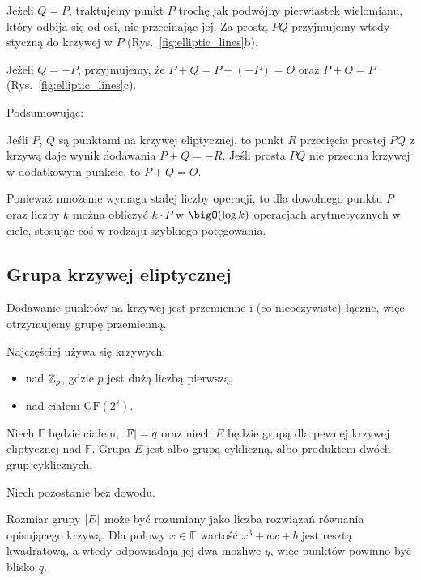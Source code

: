 Jeżeli \( Q = P \), traktujemy punkt \( P \) trochę jak podwójny pierwiastek wielomianu, który odbija się od osi, nie przecinając jej.
Za prostą \( PQ \) przyjmujemy wtedy styczną do krzywej w \( P \) (Rys.~\ref{fig:elliptic_lines}b).

Jeżeli \( Q = -P \), przyjmujemy, że \( P + Q = P + (-P) = O \) oraz \(P + O = P \) (Rys.~\ref{fig:elliptic_lines}c).

Podsumowując:
\begin{definition}[Dodawanie]
    Jeśli \( P \), \( Q \) są punktami na krzywej eliptycznej, to punkt \( R \) przecięcia prostej \( PQ \) z krzywą daje wynik dodawania \( P + Q = -R \).
    Jeśli prosta \( PQ \) nie przecina krzywej w dodatkowym punkcie, to \( P + Q = O \).
\end{definition}

Ponieważ mnożenie wymaga stałej liczby operacji, to dla dowolnego punktu \( P \) oraz liczby \( k \) można obliczyć \( k \cdot P \) w \( \bigO(\log k) \) operacjach arytmetycznych w ciele, stosując coś w rodzaju szybkiego potęgowania.

\subsection{Grupa krzywej eliptycznej}
Dodawanie punktów na krzywej jest przemienne i (co nieoczywiste) łączne, więc otrzymujemy grupę przemienną.

Najczęściej używa się krzywych:
\begin{itemize}
    \item nad \( \mathbb{Z}_p \), gdzie \( p \) jest dużą liczbą pierwszą,
    \item nad ciałem \( \text{GF}(2^s) \).
\end{itemize}

\begin{theorem}
    Niech \( \mathbb{F} \) będzie ciałem, \( \left\lvert\mathbb{F}\right\rvert = q \) oraz niech \( E \) będzie grupą dla pewnej krzywej eliptycznej nad \( \mathbb{F} \). Grupa \( E \) jest albo grupą cykliczną, albo produktem dwóch grup cyklicznych.
\end{theorem}
Niech pozostanie bez dowodu.

Rozmiar grupy \( \left\lvert E\right\rvert \) może być rozumiany jako liczba rozwiązań równania opisującego krzywą.
Dla połowy \( x \in \mathbb{F} \) wartość \( x^3 + ax + b \) jest resztą kwadratową, a wtedy odpowiadają jej dwa możliwe \( y \), więc punktów powinno być blisko \( q \).